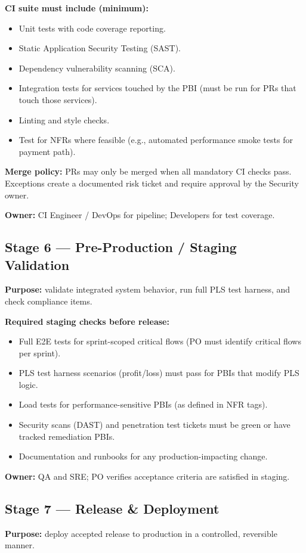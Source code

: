 \documentclass[11pt,a4paper]{article}
\begin{document}
\textbf{CI suite must include (minimum):}
\begin{itemize}
  \item Unit tests with code coverage reporting.
  \item Static Application Security Testing (SAST).
  \item Dependency vulnerability scanning (SCA).
  \item Integration tests for services touched by the PBI (must be run for PRs that touch those services).
  \item Linting and style checks.
  \item Test for NFRs where feasible (e.g., automated performance smoke tests for payment path).
\end{itemize}

\textbf{Merge policy:} PRs may only be merged when all mandatory CI checks pass. Exceptions create a documented risk ticket and require approval by the Security owner.

\textbf{Owner:} CI Engineer / DevOps for pipeline; Developers for test coverage.

\subsection{Stage 6 — Pre-Production / Staging Validation}
\textbf{Purpose:} validate integrated system behavior, run full PLS test harness, and check compliance items.

\textbf{Required staging checks before release:}
\begin{itemize}
  \item Full E2E tests for sprint-scoped critical flows (PO must identify critical flows per sprint).
  \item PLS test harness scenarios (profit/loss) must pass for PBIs that modify PLS logic.
  \item Load tests for performance-sensitive PBIs (as defined in NFR tags).
  \item Security scans (DAST) and penetration test tickets must be green or have tracked remediation PBIs.
  \item Documentation and runbooks for any production-impacting change.
\end{itemize}

\textbf{Owner:} QA and SRE; PO verifies acceptance criteria are satisfied in staging.

\subsection{Stage 7 — Release \& Deployment}
\textbf{Purpose:} deploy accepted release to production in a controlled, reversible manner.
\end{document}
